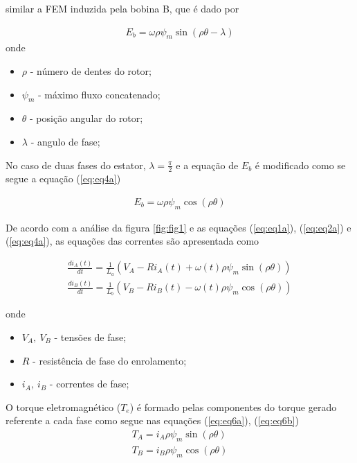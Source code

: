 similar a FEM induzida pela bobina B, que é dado por

\begin{eqnarray}
		\label{eq:eq3a}
		E_b = \omega \rho \psi_m \sin(\rho \theta - \lambda)
\end{eqnarray}
onde
\begin{itemize}
	\item $\rho$ - número de dentes do rotor; \\
	\item $\psi_m$ - máximo fluxo concatenado; \\
	\item $\theta$ - posição angular do rotor; \\
	\item $\lambda$ - angulo de fase; \\
\end{itemize}

No caso de duas fases do estator, $\lambda = \frac{\pi}{2}$ e a equação de $E_b$ é modificado como se segue a equação (\ref{eq:eq4a})

\begin{eqnarray}
		\label{eq:eq4a}
		E_b = \omega \rho \psi_m \cos(\rho \theta )
\end{eqnarray}

De acordo com a análise da figura \ref{fig:fig1} e as equações (\ref{eq:eq1a}), (\ref{eq:eq2a}) e (\ref{eq:eq4a}), as equações das correntes são apresentada como

\begin{eqnarray}
	\label{eq:eq5a}
	\frac{d i_A(t)}{dt} = \frac{1}{L_a}\left(V_A - Ri_A(t) + \omega(t) \rho \psi_m \sin(\rho \theta) \right) \\
	\label{eq:eq5b}
	\frac{d i_B(t)}{dt} = \frac{1}{L_b}\left(V_B - Ri_B(t) - \omega(t) \rho \psi_m \cos(\rho \theta) \right) 
\end{eqnarray}

onde
\begin{itemize}
	\item $V_A,\ V_B$ - tensões de fase; \\
	\item $R$ - resistência de fase do enrolamento; \\
	\item $i_A,\ i_B$ - correntes de fase;\\
\end{itemize}

O torque eletromagnético ($T_e$) é formado pelas componentes do torque gerado referente a cada fase como segue nas equações (\ref{eq:eq6a}), (\ref{eq:eq6b})
\begin{eqnarray}
\label{eq:eq6a}
T_A = i_A \rho \psi_m \sin(\rho \theta)\\
\label{eq:eq6b}
T_B = i_B \rho \psi_m \cos(\rho \theta) 
\end{eqnarray}

